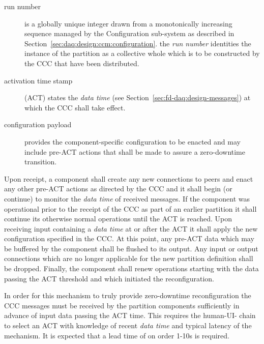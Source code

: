 \begin{description}
\item[run number] is a globally unique integer drawn from a monotonically increasing sequence managed by the  Configuration sub-system as described in Section~\ref{sec:daq:design:ccm:configuration}. 
  the \textit{run number} identities the instance of the partition as a collective whole which is to be constructed by the CCC that have been distributed.
\item[activation time stamp] (ACT) states the \textit{data time} (see Section~\ref{sec:fd-daq:design-messages}) at which the CCC shall take effect. 
\item[configuration payload] provides the component-specific configuration to be enacted and may include  pre-ACT actions that shall be made to assure a zero-downtime transition.
\end{description}

Upon receipt, a component shall create any new connections to peers and enact any other pre-ACT actions as directed by the CCC and it shall begin (or continue) to monitor the \textit{data time} of received messages. 
If the component was operational prior to the receipt of the CCC as part of an earlier partition it shall continue its otherwise normal operations until the ACT is reached. 
Upon receiving input containing a \textit{data time} at or after the ACT it shall apply the new configuration specified in the CCC. 
At this point, any pre-ACT data which may be buffered by the component shall be flushed to its output. 
Any input or output connections which are no longer applicable for the new partition definition shall be dropped. 
Finally, the component shall renew operations starting with the data passing the ACT threshold and which initiated the reconfiguration.

In order for this mechanism to truly provide zero-downtime reconfiguration the CCC messages must be received by the partition components sufficiently in advance of input data passing the ACT time.
This requires the human-UI- chain to select an ACT with knowledge of recent \textit{data time} and typical latency of the mechanism. 
It is expected that a lead time of on order 1-10s is required. 


